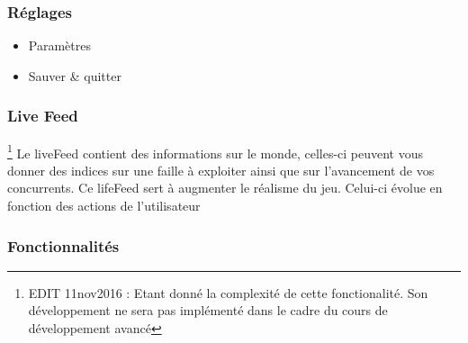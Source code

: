 \subsubsection{Réglages}
\begin{itemize}
            \item Paramètres
            \item Sauver \& quitter
\end{itemize}
\subsubsection{Live Feed}\footnote{EDIT 11nov2016 : Etant donné la complexité de cette fonctionalité. Son développement ne sera pas implémenté dans le cadre du cours de développement avancé}
Le liveFeed contient des informations sur le monde, celles-ci peuvent vous donner des indices sur une faille à exploiter ainsi que sur l'avancement de vos concurrents. Ce lifeFeed sert à augmenter le réalisme du jeu. Celui-ci évolue en fonction des actions de l'utilisateur

\subsubsection{Fonctionnalités}


